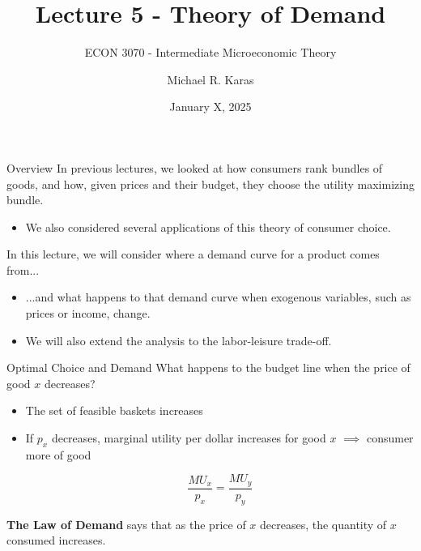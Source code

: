 \documentclass[12pt,t]{beamer}
\author{Michael R. Karas}
\title{Lecture 5 - Theory of Demand}
\subtitle{ECON 3070 - Intermediate Microeconomic Theory}
\date{January X, 2025}
\begin{document}
\begin{frame}
  \titlepage
\end{frame}

\begin{frame}{Overview}
  In previous lectures, we looked at how consumers rank bundles of goods, and how, given prices and their budget, they choose the utility maximizing bundle.

  \begin{itemize}
    \item We also considered several applications of this theory of consumer choice.
  \end{itemize}

  \bigskip
  In this lecture, we will consider where a demand curve for a product comes from...

  \begin{itemize}
    \item ...and what happens to that demand curve when exogenous variables, such as prices or income, change.

    \item We will also extend the analysis to the labor-leisure trade-off.
  \end{itemize}
\end{frame}

\begin{frame}{Optimal Choice and Demand}
  What happens to the budget line when the price of good $x$ decreases?

  \bigskip\pause
  \begin{itemize}
    \item The set of feasible baskets increases

    \pause
    \item If $p_x$ decreases, marginal utility per dollar increases for good $x$ $\implies$ consumer more of good 
    
    $$\frac{MU_x}{p_x} = \frac{MU_y}{p_y}$$
  \end{itemize}

  \pause\bigskip
  \textbf{The Law of Demand} says that as the price of $x$ decreases, the quantity of $x$ consumed increases.
\end{frame}
\end{document}

